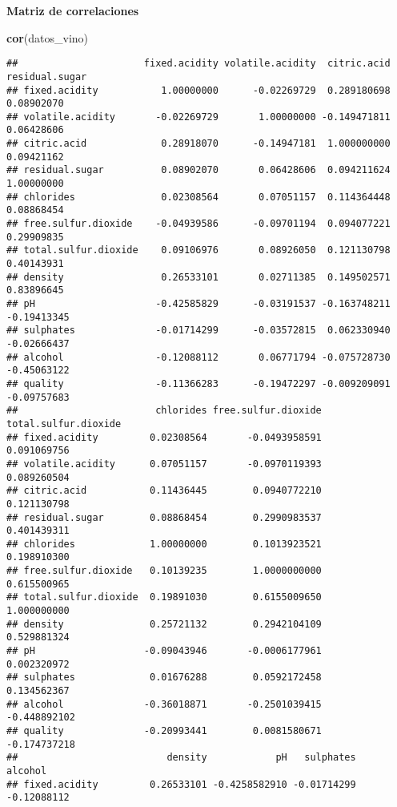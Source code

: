\documentclass[
]{article}
\newenvironment{Shaded}{\begin{snugshade}}{\end{snugshade}}
\newcommand{\FunctionTok}[1]{\textcolor[rgb]{0.13,0.29,0.53}{\textbf{#1}}}
\newcommand{\NormalTok}[1]{#1}
\begin{document}
\textbf{Matriz de correlaciones}

\begin{Shaded}
\begin{Highlighting}[]
\FunctionTok{cor}\NormalTok{(datos\_vino)}
\end{Highlighting}
\end{Shaded}

\begin{verbatim}
##                      fixed.acidity volatile.acidity  citric.acid residual.sugar
## fixed.acidity           1.00000000      -0.02269729  0.289180698     0.08902070
## volatile.acidity       -0.02269729       1.00000000 -0.149471811     0.06428606
## citric.acid             0.28918070      -0.14947181  1.000000000     0.09421162
## residual.sugar          0.08902070       0.06428606  0.094211624     1.00000000
## chlorides               0.02308564       0.07051157  0.114364448     0.08868454
## free.sulfur.dioxide    -0.04939586      -0.09701194  0.094077221     0.29909835
## total.sulfur.dioxide    0.09106976       0.08926050  0.121130798     0.40143931
## density                 0.26533101       0.02711385  0.149502571     0.83896645
## pH                     -0.42585829      -0.03191537 -0.163748211    -0.19413345
## sulphates              -0.01714299      -0.03572815  0.062330940    -0.02666437
## alcohol                -0.12088112       0.06771794 -0.075728730    -0.45063122
## quality                -0.11366283      -0.19472297 -0.009209091    -0.09757683
##                        chlorides free.sulfur.dioxide total.sulfur.dioxide
## fixed.acidity         0.02308564       -0.0493958591          0.091069756
## volatile.acidity      0.07051157       -0.0970119393          0.089260504
## citric.acid           0.11436445        0.0940772210          0.121130798
## residual.sugar        0.08868454        0.2990983537          0.401439311
## chlorides             1.00000000        0.1013923521          0.198910300
## free.sulfur.dioxide   0.10139235        1.0000000000          0.615500965
## total.sulfur.dioxide  0.19891030        0.6155009650          1.000000000
## density               0.25721132        0.2942104109          0.529881324
## pH                   -0.09043946       -0.0006177961          0.002320972
## sulphates             0.01676288        0.0592172458          0.134562367
## alcohol              -0.36018871       -0.2501039415         -0.448892102
## quality              -0.20993441        0.0081580671         -0.174737218
##                          density            pH   sulphates     alcohol
## fixed.acidity         0.26533101 -0.4258582910 -0.01714299 -0.12088112

\end{verbatim}
\end{document}
